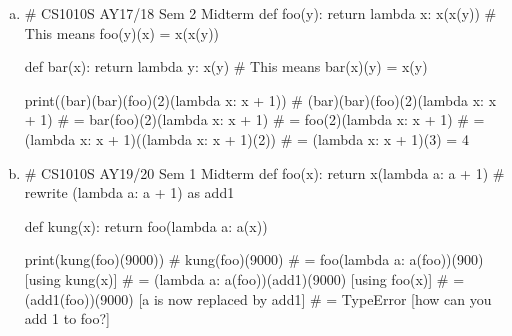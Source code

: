 \begin{enumerate}[(a)]
\item
\begin{python}
# CS1010S AY17/18 Sem 2 Midterm
def foo(y):
    return lambda x: x(x(y))
# This means foo(y)(x) = x(x(y))

def bar(x):
    return lambda y: x(y)
# This means bar(x)(y) = x(y)

print((bar)(bar)(foo)(2)(lambda x: x + 1))
# (bar)(bar)(foo)(2)(lambda x: x + 1)
# = bar(foo)(2)(lambda x: x + 1)
# = foo(2)(lambda x: x + 1)
# = (lambda x: x + 1)((lambda x: x + 1)(2))
# = (lambda x: x + 1)(3) = 4
\end{python}

\item
\begin{python}
# CS1010S AY19/20 Sem 1 Midterm
def foo(x):
    return x(lambda a: a + 1) # rewrite (lambda a: a + 1) as add1

def kung(x):
    return foo(lambda a: a(x))

print(kung(foo)(9000))
# kung(foo)(9000)
# = foo(lambda a: a(foo))(900)          [using kung(x)]
# = (lambda a: a(foo))(add1)(9000)      [using foo(x)]
# = (add1(foo))(9000)                   [a is now replaced by add1]
# = TypeError                           [how can you add 1 to foo?]
\end{python}
\end{enumerate}

